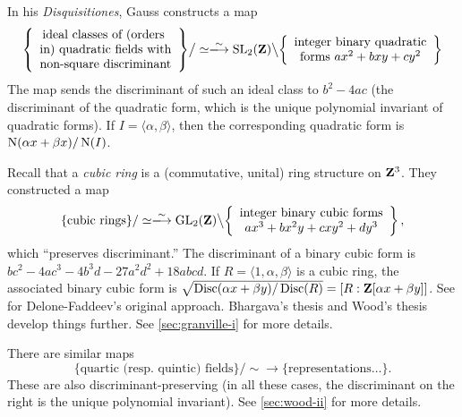 \begin{example}[Gauss]
In his \emph{Disquisitiones}, Gauss constructs a map 
\[
  \left\{\begin{array}{c}\text{ideal classes of (orders } \\ \text{in) quadratic fields with} \\ \text{non-square discriminant}\end{array}\right\}\bigr/\simeq 
  \iso 
  \speciallinear_2(\dZ)\bigl\backslash \left\{\begin{array}{c}\text{integer binary quadratic} \\ \text{forms }a x^2+b x y+c y^2\end{array} \right\} 
\]
The map sends the discriminant of such an ideal class to $b^2-4 a c$ (the 
discriminant of the quadratic form, which is the unique polynomial invariant 
of quadratic forms). If $I=\langle \alpha,\beta\rangle$, then 
the corresponding quadratic form is $\operatorname{N}(\alpha x+\beta x)/\operatorname{N}(I)$. 
\end{example}

\begin{example} %
Recall that a \emph{cubic ring} is a (commutative, unital) ring structure 
on $\mathbf{Z}^3$. They constructed a map 
\[
  \{\text{cubic rings}\}/\simeq \iso \generallinear_2(\dZ)\bigl\backslash\left\{\begin{array}{c}\text{integer binary cubic forms} \\ ax^3+b x^2 y+c x y^2+d y^3\end{array}\right\} ,
\]
which ``preserves discriminant.'' The discriminant of a binary cubic form is 
$b c^2-4 a c^3 - 4 b^3 d - 27 a^2 d^2 + 18 a b c d$. If 
$R=\langle 1,\alpha,\beta\rangle$ is a cubic ring, the associated binary cubic 
form is 
$\sqrt{\operatorname{Disc}(\alpha x+\beta y)/\operatorname{Disc}(R)} = [R:\mathbf{Z}[\alpha x+\beta y]]$. 
See \cite{df64} for Delone-Faddeev's original approach. Bhargava's thesis 
\cite{b01} and Wood's thesis \cite{w09} develop things further. See 
\autoref{sec:granville-i} for more details. 
\end{example}

\begin{example} %
There are similar maps 
\[
  \{\text{quartic (resp.~quintic) fields}\}/\sim \to \{\text{representations\ldots}\} .
\]
These are also discriminant-preserving (in all these cases, the discriminant on 
the right is the unique polynomial invariant). See \autoref{sec:wood-ii} for 
more details. 
\end{example}

